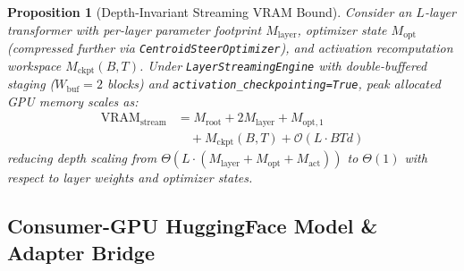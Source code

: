 \documentclass[10pt,twocolumn,letterpaper]{article}
\newtheorem{proposition}{Proposition}
\begin{document}
\begin{proposition}[Depth-Invariant Streaming VRAM Bound]
\label{prop:streaming_vram}
Consider an $L$-layer transformer with per-layer parameter footprint $M_{\text{layer}}$, optimizer state $M_{\text{opt}}$ (compressed further via \texttt{CentroidSteerOptimizer}), and activation recomputation workspace $M_{\text{ckpt}}(B, T)$. Under \texttt{LayerStreamingEngine} with double-buffered staging ($W_{\text{buf}}=2$ blocks) and \texttt{activation\_checkpointing=True}, peak allocated GPU memory scales as:
\begin{equation}
\begin{aligned}
    \text{VRAM}_{\text{stream}} &= M_{\text{root}} + 2 M_{\text{layer}} + M_{\text{opt},1} \\
    &\quad + M_{\text{ckpt}}(B, T) + \mathcal{O}(L \cdot B T d)
\end{aligned}
\end{equation}
reducing depth scaling from $\Theta(L \cdot (M_{\text{layer}} + M_{\text{opt}} + M_{\text{act}}))$ to $\Theta(1)$ with respect to layer weights and optimizer states.
\end{proposition}

\subsection{Consumer-GPU HuggingFace Model \& Adapter Bridge}
\label{sec:hf_bridge}
\end{document}

